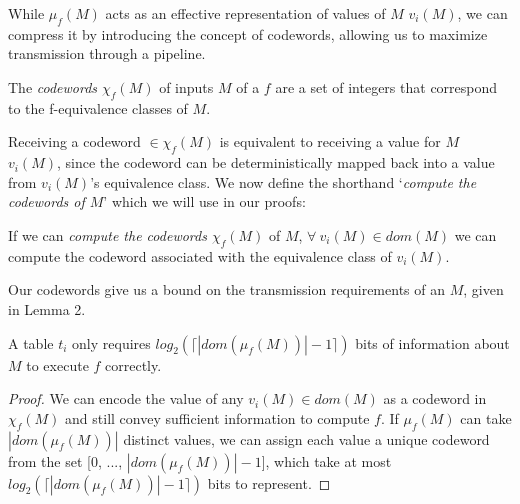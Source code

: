 

While $\mu_f(M)$ acts as an effective representation of values of $M$ $v_i(M)$, we can compress it by introducing the concept of codewords, allowing us to maximize transmission through a pipeline.

\begin{definition} The {\em codewords $\chi_f(M)$} of inputs $M$ of a $f$ are a set of integers that correspond to the f-equivalence classes of $M$.
\end{definition}

Receiving a codeword $\in \chi_f(M)$ is equivalent to receiving a value for $M$ $v_i(M)$, since the codeword can be deterministically mapped back into a value from $v_i(M)$'s equivalence class. We now define the shorthand `\textit{compute the codewords of $M$}' which we will use in our proofs:

\begin{definition} If we can {\em compute the codewords $\chi_f(M)$} of $M$, $\forall\ v_i(M) \in dom(M)$ we can compute the codeword associated with the equivalence class of $v_i(M)$.
\end{definition}

Our codewords give us a bound on the transmission requirements of an $M$, given in Lemma 2.

\begin{lemma} 
\label{lemma:codewords}
A table $t_i$ only requires $log_2(\lceil |dom(\mu_f(M))|-1 \rceil)$ bits of information about $M$ to execute $f$ correctly.
\end{lemma}

\begin{proof}
We can encode the value of any $v_i(M) \in dom(M)$ as a codeword in $\chi_f(M)$ and still convey sufficient information to compute $f$. If $\mu_f(M)$ can take $|dom(\mu_f(M))|$ distinct values, we can assign each value a unique codeword from the set [$0$, $...$, $|dom(\mu_f(M))|-1$], which take at most $log_2(\lceil |dom(\mu_f(M))|-1 \rceil)$ bits to represent.
\end{proof}

